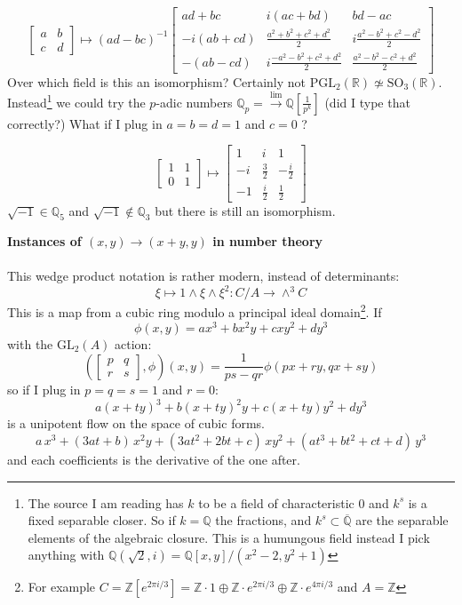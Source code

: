 \documentclass[12pt]{article}
\begin{document}
$$ \left[\begin{array}{cc}
a & b \\ c & d \end{array} \right] \mapsto (ad-bc)^{-1}
\left[ \begin{array}{ccc} 
ad + bc & i(ac+bd) & bd-ac \\
-i(ab+cd) & \frac{a^2 + b^2 + c^2 + d^2}{2}
& i \frac{a^2 - b^2 + c^2 - d^2}{2} \\ 
-(ab-cd) & i \frac{-a^2 - b^2 + c^2 + d^2}{2} & 
\frac{a^2 - b^2 - c^2 + d^2}{2} \end{array}\right]$$
Over which field is this an isomorphism?  Certainly not $\text{PGL}_2(\mathbb{R}) \not \simeq \text{SO}_3(\mathbb{R}).$  Instead\footnote{The source I am reading has $k$ to be a field of characteristic $0$ and $k^s$ is a fixed separable closer.  So if $k = \mathbb{Q}$ the fractions, and $k^s \subset \overline{\mathbb{Q}}$ are the separable elements of the algebraic closure.  This is a humungous field instead I pick anything with $\mathbb{Q}(\sqrt{2}, i) = \mathbb{Q}[x,y]/(x^2 - 2, y^2 + 1)$} we could try the $p$-adic numbers $ \mathbb{Q}_p = \stackrel{\lim}{\to} \mathbb{Q}[\frac{1}{p^k}] $ (did I type that correctly?) What if I plug in $a = b = d = 1$ and $c = 0$ ?

$$ \left[\begin{array}{cc}
1 & 1 \\ 0 & 1 \end{array} \right] \mapsto 
\left[ \begin{array}{rrr} 
1 & i & 1 \\
-i & \frac{3}{2}
&  -\frac{i}{2} \\ 
-1 &  \frac{i}{2} & 
\frac{1}{2} \end{array}\right]$$
$\sqrt{-1} \in \mathbb{Q}_5$ and $\sqrt{-1}\notin \mathbb{Q}_3$ but there is still an isomorphism.
\newpage


\noindent \textbf{Instances of $(x,y) \to (x+y,y)$ in number theory} \\ \\
This wedge product notation is rather modern, instead of determinants:
$$ \xi \mapsto 1 \wedge \xi \wedge \xi^2 : C / A \to \wedge^3 C $$
This is a map from a cubic ring modulo a principal ideal domain\footnote{For example $C = \mathbb{Z}[e^{2\pi i / 3}]= \mathbb{Z}\cdot 1 \oplus \mathbb{Z} \cdot e^{2\pi i / 3} \oplus \mathbb{Z}\cdot e^{4\pi i / 3}$ and $A = \mathbb{Z}$}.  If 
$$ \phi(x,y) = ax^3 + bx^2 y + c xy^2 + dy^3$$
with the $\text{GL}_2(A)$ action:
$$ \left(\left[ 
\begin{array}{cc} p & q \\ r & s\end{array}
\right], \phi \right)(x,y) = \frac{1}{ps-qr}\phi(px + ry, qx + sy) $$
so if I plug in $p=q=s=1$ and $r = 0$:
$$ a(x+ty)^3 + b(x+ty)^2 y + c(x+ty)y^2 + dy^3 $$
is a unipotent flow on the space of cubic forms.
$$ a\,x^3 + (3at+b)\,x^2 y + (3at^2 + 2bt + c)\,xy^2 + (at^3 + bt^2 + ct + d)\,y^3 $$
and each coefficients is the derivative of the one after.
\newpage
\end{document}
